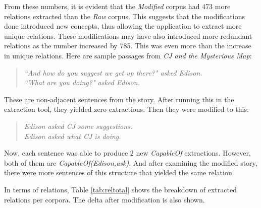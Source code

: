 From these numbers, it is evident that the \textit{Modified} corpus had 473 more relations extracted than the \textit{Raw} corpus. This suggests that the modifications done introduced new concepts, thus allowing the application to extract more unique relations. These modifications may have also introduced more redundant relations as the number increased by 785. This was even more than the increase in unique relations. Here are sample passages from \textit{CJ and the Mysterious Map}:

\begin{verse}
\itshape
``And how do you suggest we get up there?" asked Edison.\\
``What are you doing?" asked Edison.\\
\end{verse}

These are non-adjacent sentences from the story. After running this in the extraction tool, they yielded zero extractions. Then they were modified to this:

\begin{verse}
\itshape
Edison asked CJ some suggestions.\\
Edison asked what CJ is doing.\\
\end{verse}

Now, each sentence was able to produce 2 new \textit{CapableOf} extractions. However, both of them are \textit{CapableOf(Edison,ask)}. And after examining the modified story, there were more sentences of this structure that yielded the same relation. 

In terms of relations, Table \ref{tab:reltotal} shows the breakdown of extracted relations per corpora. The delta after modification is also shown. 

